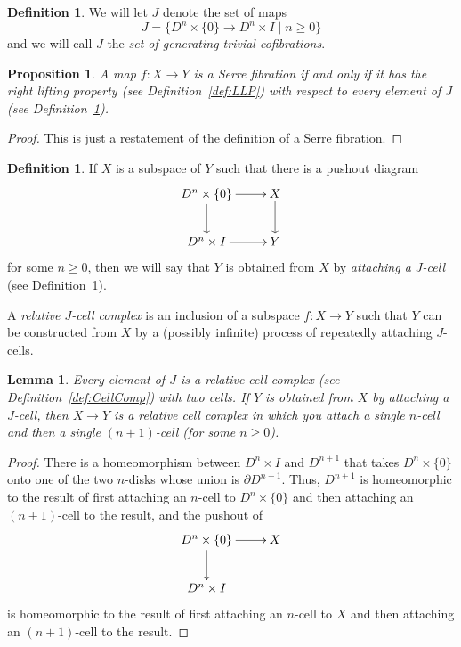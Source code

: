 \documentclass[12pt]{amsart}
\numberwithin{equation}{section}
\theoremstyle{slplain}
\newtheorem{lem}[equation]{Lemma}
\newtheorem{prop}[equation]{Proposition}
\theoremstyle{definition}
\newtheorem{defn}[equation]{Definition} %
\theoremstyle{remark}
\newcommand{\defref}{Definition~\ref}
\newcommand{\suchthat}{\mid}
\begin{document}
\begin{defn}
  \label{def:gtc}
  We will let $J$ denote the set of maps
  \begin{displaymath}
    J = \bigl\{D^{n}\times\{0\} \to D^{n}\times I
        \suchthat n \ge 0\bigr\}
  \end{displaymath}
  and we will call $J$ the \emph{set of generating trivial
    cofibrations}.
\end{defn}


\begin{prop}
  \label{prop:defSfib}
  A map $f\colon X \to Y$ is a Serre fibration if and only if it has
  the right lifting property (see \defref{def:LLP}) with respect to
  every element of $J$ (see \defref{def:gtc}).
\end{prop}

\begin{proof}
  This is just a restatement of the definition of a Serre fibration.
\end{proof}


\begin{defn}
  \label{def:RlJClCmp}
  If $X$ is a subspace of $Y$ such that there is a pushout diagram
  \begin{displaymath}
    \xymatrix{
      {D^{n}\times \{0\}} \ar[r] \ar[d]
      & {X} \ar[d]\\
      {D^{n}\times I} \ar[r]
      & {Y}
    }
  \end{displaymath}
  for some $n \ge 0$, then we will say that $Y$ is obtained from $X$
  by \emph{attaching a $J$-cell} (see \defref{def:gtc}).

  A \emph{relative $J$-cell complex} is an inclusion of a subspace
  $f\colon X \to Y$ such that $Y$ can be constructed from $X$ by a
  (possibly infinite) process of repeatedly attaching $J$-cells.
\end{defn}


\begin{lem}
  \label{lem:Jcell}
  Every element of $J$ is a relative cell complex (see
  \defref{def:CellComp}) with two cells.  If $Y$ is obtained from $X$
  by attaching a $J$-cell, then $X \to Y$ is a relative cell complex
  in which you attach a single $n$-cell and then a single $(n+1)$-cell
  (for some $n \ge 0$).
\end{lem}

\begin{proof}
  There is a homeomorphism between $D^{n}\times I$ and $D^{n+1}$ that
  takes $D^{n}\times\{0\}$ onto one of the two $n$-disks whose union
  is $\partial D^{n+1}$.  Thus, $D^{n+1}$ is homeomorphic to the
  result of first attaching an $n$-cell to $D^{n}\times \{0\}$ and then
  attaching an $(n+1)$-cell to the result, and the pushout of
  \begin{displaymath}
    \xymatrix{
      {D^{n}\times\{0\}} \ar[r] \ar[d]
      & {X}\\
      {D^{n}\times I}
    }
  \end{displaymath}
  is homeomorphic to the result of first attaching an $n$-cell to $X$
  and then attaching an $(n+1)$-cell to the result.
\end{proof}
\end{document}
